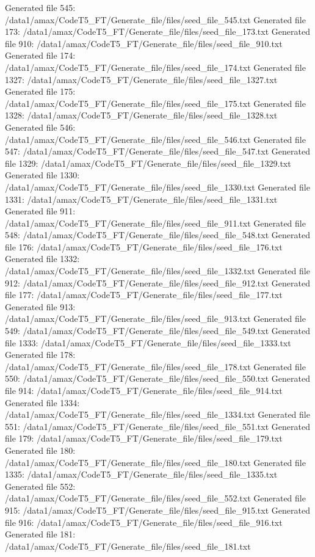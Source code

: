 Generated file 545: /data1/amax/CodeT5_FT/Generate_file/files/seed_file_545.txt
Generated file 173: /data1/amax/CodeT5_FT/Generate_file/files/seed_file_173.txt
Generated file 910: /data1/amax/CodeT5_FT/Generate_file/files/seed_file_910.txt
Generated file 174: /data1/amax/CodeT5_FT/Generate_file/files/seed_file_174.txt
Generated file 1327: /data1/amax/CodeT5_FT/Generate_file/files/seed_file_1327.txt
Generated file 175: /data1/amax/CodeT5_FT/Generate_file/files/seed_file_175.txt
Generated file 1328: /data1/amax/CodeT5_FT/Generate_file/files/seed_file_1328.txt
Generated file 546: /data1/amax/CodeT5_FT/Generate_file/files/seed_file_546.txt
Generated file 547: /data1/amax/CodeT5_FT/Generate_file/files/seed_file_547.txt
Generated file 1329: /data1/amax/CodeT5_FT/Generate_file/files/seed_file_1329.txt
Generated file 1330: /data1/amax/CodeT5_FT/Generate_file/files/seed_file_1330.txt
Generated file 1331: /data1/amax/CodeT5_FT/Generate_file/files/seed_file_1331.txt
Generated file 911: /data1/amax/CodeT5_FT/Generate_file/files/seed_file_911.txt
Generated file 548: /data1/amax/CodeT5_FT/Generate_file/files/seed_file_548.txt
Generated file 176: /data1/amax/CodeT5_FT/Generate_file/files/seed_file_176.txt
Generated file 1332: /data1/amax/CodeT5_FT/Generate_file/files/seed_file_1332.txt
Generated file 912: /data1/amax/CodeT5_FT/Generate_file/files/seed_file_912.txt
Generated file 177: /data1/amax/CodeT5_FT/Generate_file/files/seed_file_177.txt
Generated file 913: /data1/amax/CodeT5_FT/Generate_file/files/seed_file_913.txt
Generated file 549: /data1/amax/CodeT5_FT/Generate_file/files/seed_file_549.txt
Generated file 1333: /data1/amax/CodeT5_FT/Generate_file/files/seed_file_1333.txt
Generated file 178: /data1/amax/CodeT5_FT/Generate_file/files/seed_file_178.txt
Generated file 550: /data1/amax/CodeT5_FT/Generate_file/files/seed_file_550.txt
Generated file 914: /data1/amax/CodeT5_FT/Generate_file/files/seed_file_914.txt
Generated file 1334: /data1/amax/CodeT5_FT/Generate_file/files/seed_file_1334.txt
Generated file 551: /data1/amax/CodeT5_FT/Generate_file/files/seed_file_551.txt
Generated file 179: /data1/amax/CodeT5_FT/Generate_file/files/seed_file_179.txt
Generated file 180: /data1/amax/CodeT5_FT/Generate_file/files/seed_file_180.txt
Generated file 1335: /data1/amax/CodeT5_FT/Generate_file/files/seed_file_1335.txt
Generated file 552: /data1/amax/CodeT5_FT/Generate_file/files/seed_file_552.txt
Generated file 915: /data1/amax/CodeT5_FT/Generate_file/files/seed_file_915.txt
Generated file 916: /data1/amax/CodeT5_FT/Generate_file/files/seed_file_916.txt
Generated file 181: /data1/amax/CodeT5_FT/Generate_file/files/seed_file_181.txt
